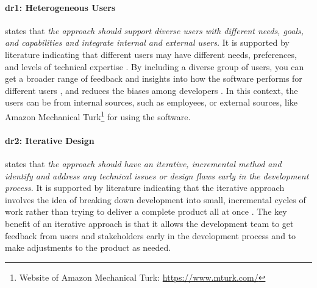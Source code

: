 
\paragraph{\ac{dr}1: Heterogeneous Users} states that \textit{the approach should support diverse users with different needs, goals, and capabilities and integrate internal and external users.} 
It is supported by literature indicating that different users may have different needs, preferences, and levels of technical expertise \cite{misc:lean:steve}.
By including a diverse group of users, you can get a broader range of feedback and insights into how the software performs for different users \cite{article:prototyping:weichbroth}, and reduces the biases among developers \cite{misc:lean:burmeister}.
In this context, the users can be from internal sources, such as employees, or external sources, like Amazon Mechanical Turk\footnote{Website of Amazon Mechanical Turk: \url{https://www.mturk.com/}} for using the software.

\paragraph{\ac{dr}2: Iterative Design} states that \textit{the approach should have an iterative, incremental method and identify and address any technical issues or design flaws early in the development process.} 
It is supported by literature indicating that the iterative approach involves the idea of breaking down development into small, incremental cycles of work rather than trying to deliver a complete product all at once \cite{misc:lean:tutorial}.
The key benefit of an iterative approach is that it allows the development team to get feedback from users and stakeholders early in the development process and to make adjustments \cite{article:experiments:lindgren} to the product as needed.

